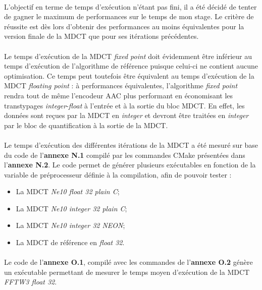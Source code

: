 \documentclass{article}
\begin{document}
    \paragraph{}
    L'objectif en terme de temps d'exécution n'étant pas fini, il a été décidé de tenter de gagner le maximum de performances sur le temps de mon stage. Le critère de réussite est dès lors d'obtenir des performances au moins équivalentes pour la version finale de la MDCT que pour ses itérations précédentes.

    \paragraph{}
    Le temps d'exécution de la MDCT \emph{fixed point} doit évidemment être inférieur au temps d'exécution de l'algorithme de référence puisque celui-ci ne contient aucune optimisation. Ce temps peut toutefois être équivalent au temps d'exécution de la MDCT \emph{floating point} : à performances équivalentes, l'algorithme \emph{fixed point} rendra tout de même l'encodeur AAC plus performant en économisant les transtypages \emph{integer}-\emph{float} à l'entrée et à la sortie du bloc MDCT. En effet, les données sont reçues par la MDCT en \emph{integer} et devront être traitées en \emph{integer} par le bloc de quantification à la sortie de la MDCT.

    \paragraph{}
    Le temps d'exécution des différentes itérations de la MDCT a été mesuré sur base du code de l'\textbf{annexe N.1} compilé par les commandes CMake présentées dans l'\textbf{annexe N.2}. Le code permet de générer plusieurs exécutables en fonction de la variable de préprocesseur définie à la compilation, afin de pouvoir tester :
    \begin{itemize}
        \item La MDCT \emph{Ne10 float 32 plain C};
        \item La MDCT \emph{Ne10 integer 32 plain C};
        \item La MDCT \emph{Ne10 integer 32 NEON};
        \item La MDCT de référence en \emph{float 32}.
    \end{itemize}

    \paragraph{}
    Le code de l'\textbf{annexe O.1}, compilé avec les commandes de l'\textbf{annexe O.2} génère un exécutable permettant de mesurer le temps moyen d'exécution de la MDCT \emph{FFTW3 float 32}.
    
\end{document}
